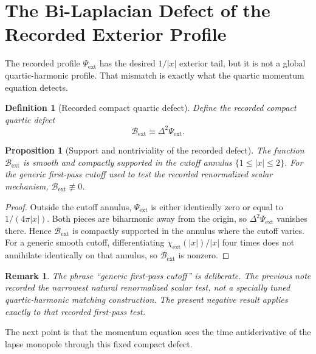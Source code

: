 \documentclass[11pt]{article}
\newtheorem{definition}{Definition}
\newtheorem{proposition}{Proposition}
\newtheorem{remark}{Remark}
\begin{document}
\section{The Bi-Laplacian Defect of the Recorded Exterior Profile}

The recorded profile \(\Psi_{\mathrm{ext}}\) has the desired \(1/|x|\) exterior tail, but it is not a global quartic-harmonic profile. That mismatch is exactly what the quartic momentum equation detects.

\begin{definition}[Recorded compact quartic defect]
Define the \emph{recorded compact quartic defect}
\begin{equation}
\mathcal B_{\mathrm{ext}}
\equiv
\Delta^2\Psi_{\mathrm{ext}}.
\label{eq:Bext}
\end{equation}
\end{definition}

\begin{proposition}[Support and nontriviality of the recorded defect]
The function \(\mathcal B_{\mathrm{ext}}\) is smooth and compactly supported in the cutoff annulus \(\{1\le |x|\le 2\}\). For the generic first-pass cutoff used to test the recorded renormalized scalar mechanism, \(\mathcal B_{\mathrm{ext}}\not\equiv 0\).
\label{prop:Bext}
\end{proposition}

\begin{proof}
Outside the cutoff annulus, \(\Psi_{\mathrm{ext}}\) is either identically zero or equal to \(1/(4\pi|x|)\). Both pieces are biharmonic away from the origin, so \(\Delta^2\Psi_{\mathrm{ext}}\) vanishes there. Hence \(\mathcal B_{\mathrm{ext}}\) is compactly supported in the annulus where the cutoff varies. For a generic smooth cutoff, differentiating \(\chi_{\mathrm{ext}}(|x|)/|x|\) four times does not annihilate identically on that annulus, so \(\mathcal B_{\mathrm{ext}}\) is nonzero.
\end{proof}

\begin{remark}
The phrase ``generic first-pass cutoff'' is deliberate. The previous note recorded the narrowest natural renormalized scalar test, not a specially tuned quartic-harmonic matching construction. The present negative result applies exactly to that recorded first-pass test.
\end{remark}

The next point is that the momentum equation sees the time antiderivative of the lapse monopole through this fixed compact defect.
\end{document}

